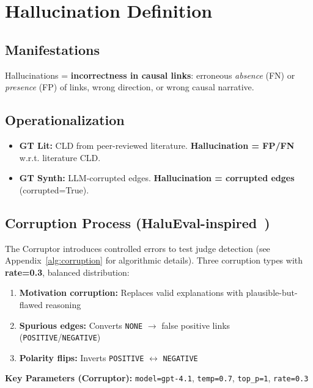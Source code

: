 \section{Hallucination Definition}
\label{sec:hallucination_definition}

\subsection{Manifestations}
Hallucinations = \textbf{incorrectness in causal links}: erroneous \textit{absence} (FN) or \textit{presence} (FP) of links, wrong direction, or wrong causal narrative.

\subsection{Operationalization}
\begin{itemize}[noitemsep]
    \item \textbf{GT Lit:} CLD from peer-reviewed literature. \textbf{Hallucination = FP/FN} w.r.t. literature CLD.
    \item \textbf{GT Synth:} LLM-corrupted edges. \textbf{Hallucination = corrupted edges} (corrupted=True).
\end{itemize}

\subsection{Corruption Process (HaluEval-inspired~\cite{li2023halueval})}
The Corruptor introduces controlled errors to test judge detection (see Appendix~\ref{alg:corruption} for algorithmic details). Three corruption types with \textbf{rate=0.3}, balanced distribution:
\begin{enumerate}[noitemsep]
    \item \textbf{Motivation corruption:} Replaces valid explanations with plausible-but-flawed reasoning
    \item \textbf{Spurious edges:} Converts \texttt{NONE} $\rightarrow$ false positive links (\texttt{POSITIVE}/\texttt{NEGATIVE})
    \item \textbf{Polarity flips:} Inverts \texttt{POSITIVE} $\leftrightarrow$ \texttt{NEGATIVE}
\end{enumerate}

\textbf{Key Parameters (Corruptor):} \texttt{model=gpt-4.1}, \texttt{temp=0.7}, \texttt{top\_p=1}, \texttt{rate=0.3}

